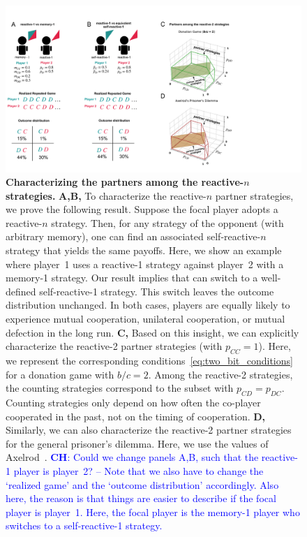 \documentclass[11pt]{article}
\newcommand{\christian}[1]{\textcolor{blue}{\textbf{CH}: #1}}
\begin{document}
\begin{figure}[t]
  \centering
  \includegraphics[width=\textwidth]{figures/conceptual_figure_results.pdf}
  \caption{
  \textbf{Characterizing the partners among the reactive-$n$ strategies.} 
{\bf A,B,} To characterize the reactive-$n$ partner strategies, we prove the following result. 
Suppose the focal player adopts a reactive-$n$ strategy. 
Then, for any strategy of the opponent (with arbitrary memory), one can find an associated self-reactive-$n$ strategy that yields the same payoffs. 
Here, we show an example where player~1 uses a reactive-1 strategy against player~2 with a memory-1 strategy. 
Our result implies that can switch to a well-defined self-reactive-1 strategy. 
This switch leaves the outcome distribution unchanged.
In both cases, players are equally likely to experience mutual cooperation, unilateral cooperation, or mutual defection in the long run. 
\textbf{C,} Based on this insight, we can explicitly characterize the reactive-2 partner strategies (with $p_{CC}\!=\!1$). 
Here, we represent the corresponding conditions~\eqref{eq:two_bit_conditions} for a donation game with $b/c\!=\!2$. 
Among the reactive-2 strategies, the counting strategies correspond to the subset with $p_{CD}\!=\!p_{DC}$. 
Counting strategies only depend on how often the co-player cooperated in the past, not on the timing of cooperation.
\textbf{D,} Similarly, we can also characterize the reactive-2 partner strategies for the general prisoner's dilemma. 
Here, we use the values of Axelrod~\citep{axelrod:AAAS:1981}.
\christian{Could we change panels A,B, such that the reactive-1 player is player~2? -- Note that we also have to change the `realized game' and the `outcome distribution' accordingly. Also here, the reason is that things are easier to describe if the focal player is player~1. Here, the focal player is the memory-1 player who switches to a self-reactive-1 strategy.}
}\label{fig:conceptual_figure_results}
\end{figure}
\end{document}
